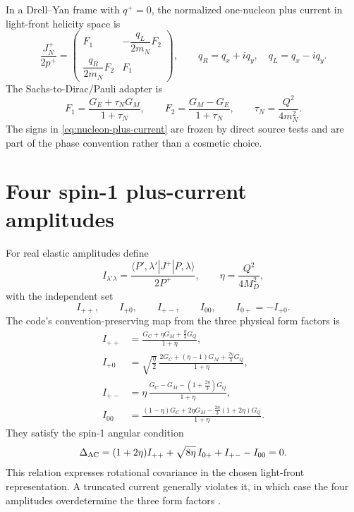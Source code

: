 \documentclass[11pt,oneside]{book}
\begin{document}
In a Drell--Yan frame with $q^+=0$, the normalized one-nucleon plus current in light-front helicity space is
\begin{equation}
 \frac{J_N^+}{2p^+}
 =\begin{pmatrix}
 F_1 & -\dfrac{q_L}{2m_N}F_2\\[0.8em]
 \dfrac{q_R}{2m_N}F_2 & F_1
 \end{pmatrix},
 \qquad
 q_R=q_x+iq_y,
 \quad q_L=q_x-iq_y.
 \label{eq:nucleon-plus-current}
\end{equation}
The Sachs-to-Dirac/Pauli adapter is
\begin{equation}
 F_1=\frac{G_E+\tau_NG_M}{1+\tau_N},
 \qquad
 F_2=\frac{G_M-G_E}{1+\tau_N},
 \qquad
 \tau_N=\frac{Q^2}{4m_N^2}.
 \label{eq:sachs-dirac-pauli}
\end{equation}
The signs in \cref{eq:nucleon-plus-current} are frozen by direct source tests and are part of the phase convention rather than a cosmetic choice.

\section{Four spin-1 plus-current amplitudes}

For real elastic amplitudes define
\begin{equation}
 I_{\lambda'\lambda}
 =\frac{\langle P',\lambda'|J^+|P,\lambda\rangle}{2P^+},
 \qquad
 \eta=\frac{Q^2}{4M_D^2},
\end{equation}
with the independent set
\begin{equation}
 I_{++},\qquad I_{+0},\qquad I_{+-},\qquad I_{00},
 \qquad I_{0+}=-I_{+0}.
\end{equation}
The code's convention-preserving map from the three physical form factors is
\begin{align}
 I_{++}&=\frac{G_C+\eta G_M+\frac{\eta}{3}G_Q}{1+\eta},
 \label{eq:Ipp}\\
 I_{+0}&=\sqrt{\frac{\eta}{2}}\,
 \frac{2G_C+(\eta-1)G_M+\frac{2\eta}{3}G_Q}{1+\eta},
 \label{eq:Ip0}\\
 I_{+-}&=\eta\,
 \frac{G_C-G_M-\left(1+\frac{2\eta}{3}\right)G_Q}{1+\eta},
 \label{eq:Ipm}\\
 I_{00}&=\frac{(1-\eta)G_C+2\eta G_M
 -\frac{2\eta}{3}(1+2\eta)G_Q}{1+\eta}.
 \label{eq:I00}
\end{align}
They satisfy the spin-1 angular condition
\begin{equation}
 \Delta_{\rm AC}
 =(1+2\eta)I_{++}
 +\sqrt{8\eta}\,I_{0+}
 +I_{+-}-I_{00}=0.
 \label{eq:angular-condition}
\end{equation}
This relation expresses rotational covariance in the chosen light-front representation.  A truncated current generally violates it, in which case the four amplitudes overdetermine the three form factors \cite{CarlsonJi2003,deMeloFrederico2003}.
\end{document}
